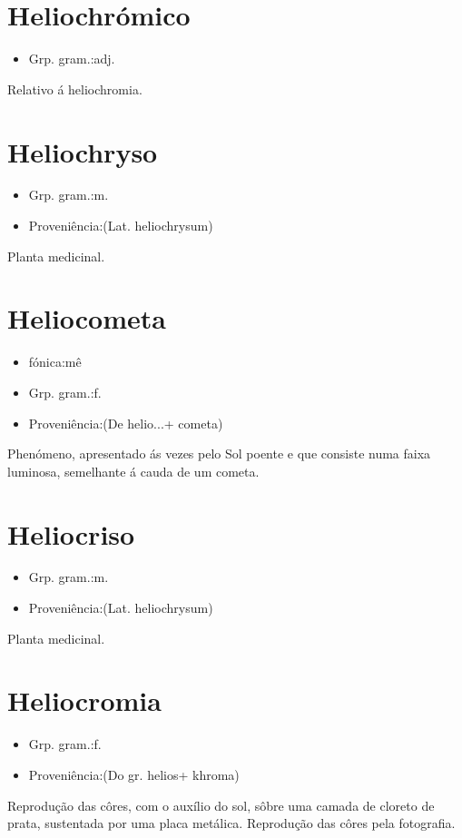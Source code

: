 \documentclass{article}
\begin{document}
\section{Heliochrómico}
\begin{itemize}
\item {Grp. gram.:adj.}
\end{itemize}
Relativo á heliochromia.
\section{Heliochryso}
\begin{itemize}
\item {Grp. gram.:m.}
\end{itemize}
\begin{itemize}
\item {Proveniência:(Lat. \textunderscore heliochrysum\textunderscore )}
\end{itemize}
Planta medicinal.
\section{Heliocometa}
\begin{itemize}
\item {fónica:mê}
\end{itemize}
\begin{itemize}
\item {Grp. gram.:f.}
\end{itemize}
\begin{itemize}
\item {Proveniência:(De \textunderscore helio...\textunderscore  + \textunderscore cometa\textunderscore )}
\end{itemize}
Phenómeno, apresentado ás vezes pelo Sol poente e que consiste numa faixa luminosa, semelhante á cauda de um cometa.
\section{Heliocriso}
\begin{itemize}
\item {Grp. gram.:m.}
\end{itemize}
\begin{itemize}
\item {Proveniência:(Lat. \textunderscore heliochrysum\textunderscore )}
\end{itemize}
Planta medicinal.
\section{Heliocromia}
\begin{itemize}
\item {Grp. gram.:f.}
\end{itemize}
\begin{itemize}
\item {Proveniência:(Do gr. \textunderscore helios\textunderscore  + \textunderscore khroma\textunderscore )}
\end{itemize}
Reprodução das côres, com o auxílio do sol, sôbre uma camada de cloreto de prata, sustentada por uma placa metálica.
Reprodução das côres pela fotografia.
\end{document}
